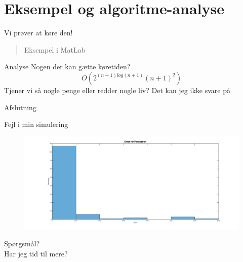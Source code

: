 \documentclass[12pt,t]{beamer}
\begin{document}
\section{Eksempel og algoritme-analyse}
\frame{\tableofcontents[currentsection]}
    \begin{frame}[t]{Vi prøver at køre den!}
        \begin{quote}
            Eksempel i MatLab
        \end{quote}
        \pause
        \begin{block}{Analyse}
            Nogen der kan gætte køretiden? \pause
            $$
                O(2^{(n+1) log(n+1)} (n + 1)^2)
                $$
                Tjener vi så nogle penge eller redder nogle liv?
                \pause
                Det kan jeg ikke svare på \Frowny{}
            \end{block}
    \end{frame}

    \begin{frame}[t]{Afslutning}
    \begin{block}{Fejl i min simulering}
        \begin{figure}[h!]
            \centering
            \includegraphics[width=1\textwidth]{include/histperc.png}
        \end{figure}
    \end{block}
    \pause
    \centering Spørgsmål?\\
    \pause
    Har jeg tid til mere?
    \end{frame}
\end{document}

